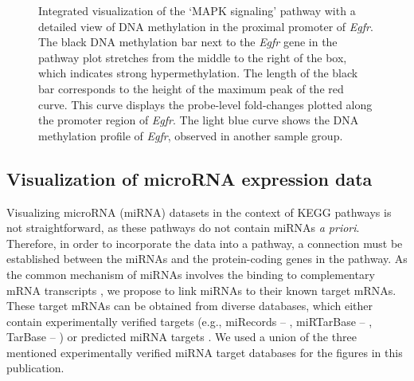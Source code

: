 \documentclass{bioinfo}
\begin{document}
\begin{figure}[tb]
\centering
\setlength\fboxsep{1pt}
\setlength\fboxrule{1pt}
\caption{Integrated visualization of the `MAPK signaling' pathway with a detailed view of DNA methylation
in the proximal promoter of \emph{Egfr}. The black DNA methylation bar next to the \emph{Egfr} gene in the pathway
plot stretches from the middle to the right of the box, which indicates strong hypermethylation. The length
of the black bar corresponds to the height of the maximum peak of the red curve. This curve displays the probe-level
fold-changes plotted along the promoter region of \emph{Egfr}. The light blue curve shows the DNA methylation
profile of \emph{Egfr}, observed in another sample group.}
\label{fig:methdetails}
\end{figure}

\subsection{Visualization of microRNA expression data}

Visualizing microRNA (miRNA) datasets in the context of KEGG pathways is not straightforward, as
these pathways do not contain miRNAs \emph{a priori}. Therefore, in order to incorporate the data into a
pathway, a connection must be established between the miRNAs and the protein-coding genes
in the pathway. As the common mechanism of miRNAs involves the binding to complementary mRNA
transcripts \citep{Bartel2004}, we propose to link miRNAs to their known target mRNAs. These target
mRNAs can be obtained from diverse databases, which either contain experimentally verified targets
(e.g., miRecords -- \citealp{miRecords}, miRTarBase -- \citealp{miRTarBase}, TarBase --
\citealp{TarBase}) or predicted miRNA targets \citep[reviewed in][]{Alexiou2009}.
We used a union of the three mentioned experimentally verified miRNA target databases for the
figures in this publication.
\end{document}
